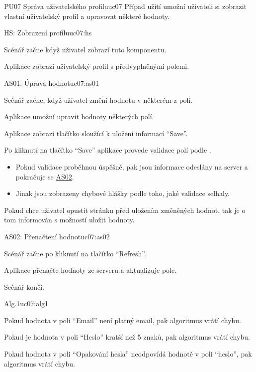 \begin{usecase}{PU07 Správa uživatelského profilu}{uc07}
    Případ užití umožní uživateli si zobrazit vlastní uživatelský profil a upravovat některé hodnoty.

    \begin{scenario}{HS: Zobrazení profilu}{uc07:hs}
        \item Scénář začne když uživatel zobrazí tuto komponentu.
        \item Aplikace zobrazí uživatelský profil s předvyplněnými polemi.
    \end{scenario}

    \begin{scenario}{AS01: Úprava hodnot}{uc07:as01}
        \item Scénář začne, když uživatel změní hodnotu v některém z polí.
        \item Aplikace umožní upravit hodnoty některých polí.
        \item Aplikace zobrazí tlačítko sloužící k uložení informací \enquote{Save}.
        \item Po kliknutí na tlačítko \enquote{Save} aplikace provede validace polí podle .
        \begin{itemize}
            \item Pokud validace proběhnou úspěšně, pak jsou informace odeslány na server a pokračuje se \hyperref[uc07:as02]{AS02}.
            \item Jinak jsou zobrazeny chybové hlášky podle toho, jaké validace selhaly.
        \end{itemize}
        \item Pokud chce uživatel opustit stránku před uložením změněných hodnot, tak je o tom informován s možností uložit hodnoty.
    \end{scenario}

    \begin{scenario}{AS02: Přenačtení hodnot}{uc07:as02}
        \item Scénář začne po kliknutí na tlačítko \enquote{Refresh}.
        \item Aplikace přenačte hodnoty ze serveru a aktualizuje pole.
        \item Scénář končí.
    \end{scenario}

    \begin{scenario}{Alg.1}{uc07:alg1}
        \item Pokud hodnota v poli \enquote{Email} není platný email, pak algoritmus vrátí chybu.
        \item Pokud je hodnota v poli \enquote{Heslo} kratší než 5 znaků, pak algoritmus vrátí chybu.
        \item Pokud hodnota v poli \enquote{Opakování hesla} neodpovídá hodnotě v poli \enquote{heslo}, pak algoritmus vrátí chybu.
    \end{scenario}
\end{usecase}